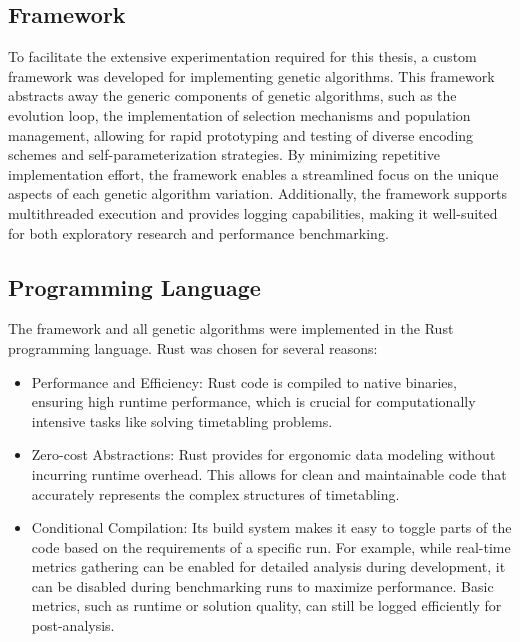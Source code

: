 \documentclass[english,examples]{isasthesis}
\begin{document}
\subsection{Framework}
To facilitate the extensive experimentation required for this thesis, a custom
framework was developed for implementing genetic algorithms. This framework
abstracts away the generic components of genetic algorithms, such as the
evolution loop, the implementation of selection mechanisms and population
management, allowing for rapid prototyping and testing of diverse
encoding schemes and self-parameterization strategies. By minimizing repetitive
implementation effort, the framework enables a streamlined focus on the unique
aspects of each genetic algorithm variation. Additionally, the framework
supports multithreaded execution and provides logging capabilities, making it
well-suited for both exploratory research and performance benchmarking.

\subsection{Programming Language}
The framework and all genetic algorithms were implemented in the Rust
programming language. Rust was chosen for several reasons:
\begin{itemize}
    \item   Performance and Efficiency: Rust code is compiled to native
            binaries, ensuring high runtime performance, which is crucial
            for computationally intensive tasks like solving timetabling
            problems.
    \item   Zero-cost Abstractions: Rust provides for ergonomic data modeling
            without incurring runtime overhead. This allows for clean and
            maintainable code that accurately represents the complex structures
            of timetabling.
    \item   Conditional Compilation: Its build system makes it easy to toggle
            parts of the code based on the requirements of a specific run.
            For example, while real-time metrics gathering can be enabled for
            detailed analysis during development, it can be disabled during
            benchmarking runs to maximize performance. Basic metrics, such as
            runtime or solution quality, can still be logged efficiently for
            post-analysis.
\end{itemize}


\end{document}
